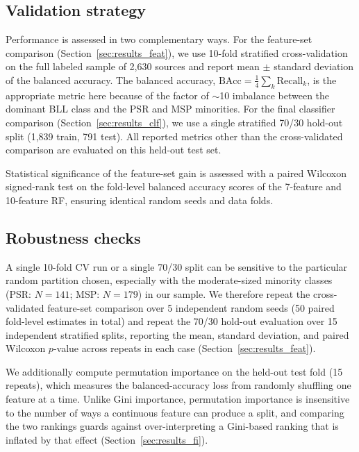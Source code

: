 \documentclass[fleqn,12pt]{article}
\newcommand{\BAcc}{\mathrm{BAcc}}
\begin{document}
\subsection{Validation strategy}

Performance is assessed in two complementary ways. For the
feature-set comparison (Section~\ref{sec:results_feat}), we use
10-fold stratified cross-validation on the full labeled sample of
2,630 sources and report mean $\pm$ standard deviation of the
balanced accuracy. The balanced accuracy,
$\BAcc = \frac{1}{4}\sum_{k}\mathrm{Recall}_k$, is the appropriate
metric here because of the factor of $\sim$10 imbalance between
the dominant BLL class and the PSR and MSP minorities. For the
final classifier comparison (Section~\ref{sec:results_clf}), we use
a single stratified 70/30 hold-out split (1,839 train, 791 test).
All reported metrics other than the cross-validated comparison are
evaluated on this held-out test set.

Statistical significance of the feature-set gain is assessed with a
paired Wilcoxon signed-rank test on the fold-level balanced accuracy
scores of the 7-feature and 10-feature RF, ensuring identical random
seeds and data folds.

\subsection{Robustness checks}
\label{ssec:robustness}

A single 10-fold CV run or a single 70/30 split can be sensitive to
the particular random partition chosen, especially with the
moderate-sized minority classes (PSR: $N=141$; MSP: $N=179$) in our
sample. We therefore repeat the cross-validated feature-set comparison
over 5 independent random seeds (50 paired fold-level estimates in
total) and repeat the 70/30 hold-out evaluation over 15 independent
stratified splits, reporting the mean, standard deviation, and paired
Wilcoxon $p$-value across repeats in each case
(Section~\ref{sec:results_feat}).

We additionally compute permutation importance
\citep{Breiman2001} on the held-out test fold (15 repeats), which
measures the balanced-accuracy loss from randomly shuffling one
feature at a time. Unlike Gini importance, permutation importance is
insensitive to the number of ways a continuous feature can produce a
split, and comparing the two rankings guards against over-interpreting
a Gini-based ranking that is inflated by that effect
(Section~\ref{sec:results_fi}).
\end{document}
